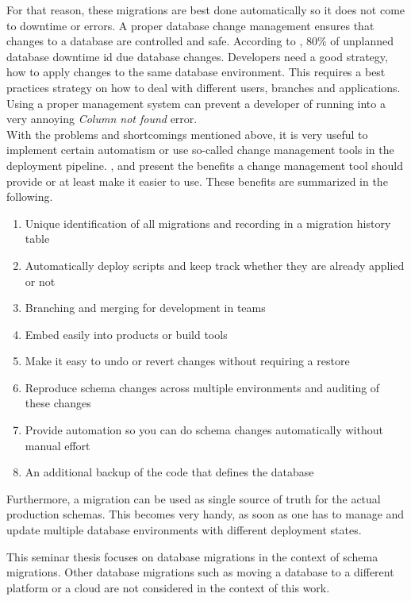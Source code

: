  For that reason, these migrations are best done automatically so it does not come to downtime or errors. A proper database change management ensures that changes to a database are controlled and safe. According to \cite{ManageForce2016}, 80\% of unplanned database downtime id due database changes.
Developers need a good strategy, how to apply changes to the same database environment.
This requires a best practices strategy on how to deal with different users, branches and applications. Using a proper management system can prevent a developer of running into a very annoying \textit{Column not found} error.\\

 
%
With the problems and shortcomings mentioned above, it is very useful to implement certain automatism or use so-called change management tools in the deployment pipeline.
\cite{Dillon2022}, \cite{Robles2021} and \cite{Fritchey2022} present the benefits a change management tool should provide or at least make it easier to use. These benefits are summarized in the following.

\begin{enumerate}
	\item Unique identification of all migrations and recording in a migration history table
    \item Automatically deploy scripts and keep track whether they are already applied or not
    \item Branching and merging for development in teams
    \item Embed easily into products or build tools
    \item Make it easy to undo or revert changes without requiring a restore
    \item Reproduce schema changes across multiple environments and auditing of these changes
    \item Provide automation so you can do schema changes automatically without manual effort
    \item An additional backup of the code that defines the database
\end{enumerate}


Furthermore, a migration can be used as single source of truth for the actual production schemas. This becomes very handy, as soon as one has to manage and update multiple database environments with different deployment states.

%
This seminar thesis focuses on database migrations in the context of schema migrations.  Other database migrations such as moving a database to a different platform or a cloud are not considered in the context of this work.

